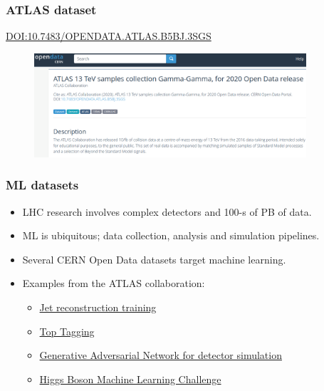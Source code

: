 \documentclass[11pt,xcolor=dvipsnames,aspectratio=169]{beamer}
\begin{document}
\begin{frame}[fragile]
  \frametitle{\bf ATLAS \Hgamgam{} dataset}
  \href{https://opendata.cern.ch/record/15006}{DOI:10.7483/OPENDATA.ATLAS.B5BJ.3SGS}
  \vspace{-5pt}
  \begin{figure}
    \includegraphics[width=0.90\textwidth]{figures/l3/atlas_gamgam.png}
  \end{figure}
\end{frame}

\begin{frame}[fragile]
  \frametitle{\bf ML datasets}
  \begin{itemize}
  \item LHC research involves complex detectors and 100-s of PB of data.
  \end{itemize}
  \begin{itemize}
\item ML is ubiquitous; data collection, analysis and simulation pipelines.
  \end{itemize}
  \begin{itemize}
  \item Several CERN Open Data datasets target machine learning.
  \end{itemize}
  \begin{itemize}
  \item Examples from the ATLAS collaboration:
  \begin{itemize}
    \item \href{https://opendata.cern.ch/record/15010}{\textcolor{EDBBlue}{Jet reconstruction training}}
    \item \href{https://opendata.cern.ch/record/15013}{\textcolor{EDBBlue}{Top Tagging}}
    \item
      \href{https://opendata.cern.ch/record/15012}{\textcolor{EDBBlue}{Generative
          Adversarial Network for detector simulation}}
    \item \href{https://opendata.cern.ch/record/328}{\textcolor{EDBBlue}{Higgs Boson Machine Learning Challenge}}
  \end{itemize}   
  \end{itemize}
\end{frame}
\end{document}
